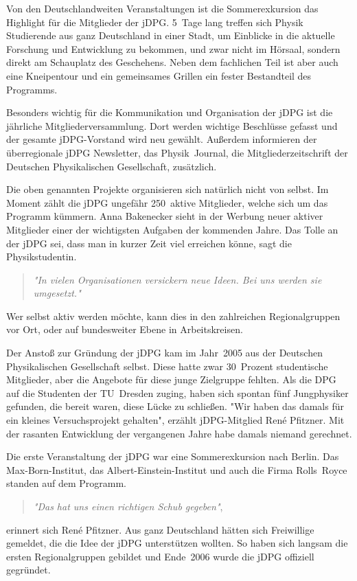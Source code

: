 \begin{multicols}{2}
Von den Deutschlandweiten Veranstaltungen ist die Sommerexkursion das Highlight für die Mitglieder der jDPG.
5~Tage lang treffen sich Physik Studierende aus ganz Deutschland in einer Stadt, um Einblicke in die aktuelle Forschung und Entwicklung zu bekommen, und zwar nicht im Hörsaal, sondern direkt am Schauplatz des Geschehens.
Neben dem fachlichen Teil ist aber auch eine Kneipentour und ein gemeinsames Grillen ein fester Bestandteil des Programms.

Besonders wichtig für die Kommunikation und Organisation der jDPG ist die jährliche Mitgliederversammlung.
Dort werden wichtige Beschlüsse gefasst und der gesamte jDPG-Vorstand wird neu gewählt.
Außerdem informieren der überregionale jDPG Newsletter, das Physik~Journal, die Mitgliederzeitschrift der Deutschen Physikalischen Gesellschaft, zusätzlich.

Die oben genannten Projekte organisieren sich natürlich nicht von selbst.
Im Moment zählt die jDPG ungefähr 250~aktive Mitglieder, welche sich um das Programm kümmern.
Anna Bakenecker sieht in der Werbung neuer aktiver Mitglieder einer der wichtigsten Aufgaben der kommenden Jahre.
Das Tolle an der jDPG sei, dass man in kurzer Zeit viel erreichen könne, sagt die Physikstudentin.
\begin{quote}
    \textit{"In vielen Organisationen versickern neue Ideen.
    Bei uns werden sie umgesetzt."}
\end{quote}
Wer selbst aktiv werden möchte, kann dies in den zahlreichen Regionalgruppen vor Ort, oder auf bundesweiter Ebene in Arbeitskreisen.

Der Anstoß zur Gründung der jDPG kam im Jahr~2005 aus der Deutschen Physikalischen Gesellschaft selbst.
Diese hatte zwar 30~Prozent studentische Mitglieder, aber die Angebote für diese junge Zielgruppe fehlten.
Als die DPG auf die Studenten der TU~Dresden zuging, haben sich spontan fünf Jungphysiker gefunden, die bereit waren, diese Lücke zu schließen.
"Wir haben das damals für ein kleines Versuchsprojekt gehalten", erzählt jDPG-Mitglied René Pfitzner.
Mit der rasanten Entwicklung der vergangenen Jahre habe damals niemand gerechnet.

Die erste Veranstaltung der jDPG war eine Sommerexkursion nach Berlin.
Das Max-Born-Institut, das Albert-Einstein-Institut und auch die Firma Rolls~Royce standen auf dem Programm.

\begin{quote}
    \textit{"Das hat uns einen richtigen Schub gegeben"},
\end{quote}
erinnert sich René Pfitzner.
Aus ganz Deutschland hätten sich Freiwillige gemeldet, die die Idee der jDPG unterstützen wollten.
So haben sich langsam die ersten Regionalgruppen gebildet und Ende~2006 wurde die jDPG offiziell gegründet.


\end{multicols}
